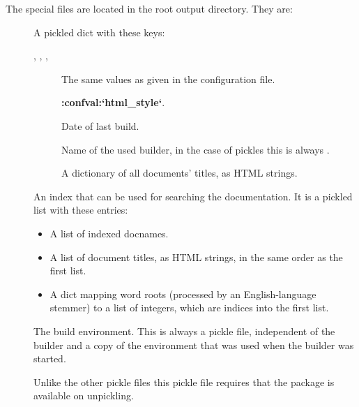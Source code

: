 \documentclass[letterpaper,10pt,english]{sphinxmanual}
\begin{document}
The special files are located in the root output directory.  They are:
\begin{description}
\item[{{\hyperref[builders:sphinx.builders.html.SerializingHTMLBuilder.globalcontext_filename]{}}}] \leavevmode
A pickled dict with these keys:
\begin{description}
\item[{, , , }] \leavevmode
The same values as given in the configuration file.

\item[{}] \leavevmode
{\color{red}\bfseries{}:confval:{}`html\_style{}`}.

\item[{}] \leavevmode
Date of last build.

\item[{}] \leavevmode
Name of the used builder, in the case of pickles this is always
.

\item[{}] \leavevmode
A dictionary of all documents' titles, as HTML strings.

\end{description}

\item[{{\hyperref[builders:sphinx.builders.html.SerializingHTMLBuilder.searchindex_filename]{}}}] \leavevmode
An index that can be used for searching the documentation.  It is a pickled
list with these entries:
\begin{itemize}
\item {} 
A list of indexed docnames.

\item {} 
A list of document titles, as HTML strings, in the same order as the first
list.

\item {} 
A dict mapping word roots (processed by an English-language stemmer) to a
list of integers, which are indices into the first list.

\end{itemize}

\item[{}] \leavevmode
The build environment.  This is always a pickle file, independent of the
builder and a copy of the environment that was used when the builder was
started.

Unlike the other pickle files this pickle file requires that the 
package is available on unpickling.

\end{description}
\end{document}

